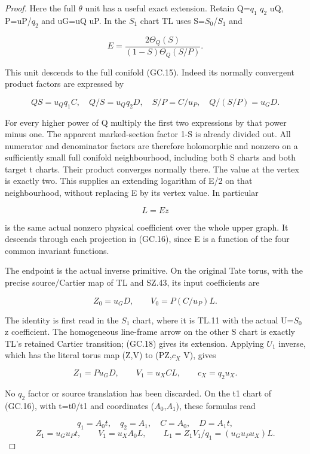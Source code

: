 \begin{proof}
Here the full \(\theta\) unit has a useful exact extension. Retain
Q=\(q_1\) \(q_2\) uQ, P=uP/\(q_2\) and uG=uQ uP. In the \(S_1\) chart TL uses
S=\(S_0\)/\(S_1\) and

\[
 E=\frac{2\Theta_Q(S)}{(1-S)\Theta_Q(S/P)}.
 \tag{GC.17}
\]

This unit descends to the full conifold (GC.15). Indeed its
normally convergent product factors are expressed by

\[
 QS=u_Qq_1C,\quad Q/S=u_Qq_2D,\quad
 S/P=C/u_P,\quad Q/(S/P)=u_GD.
 \tag{GC.18}
\]

For every higher power of Q multiply the first two expressions
by that power minus one. The apparent marked-section factor
1-S is already divided out. All numerator and denominator
factors are therefore holomorphic and nonzero on a sufficiently
small full conifold neighbourhood, including both S charts and
both target t charts. Their product converges normally there.
The value at the vertex is exactly two. This supplies an
extending logarithm of E/2 on that neighbourhood, without
replacing E by its vertex value. In particular

\[
                              L=E z
 \tag{GC.19}
\]

is the same actual nonzero physical coefficient over the whole
upper graph. It descends through each projection in (GC.16),
since E is a function of the four common invariant functions.

The endpoint is the actual inverse primitive. On the original
Tate torus, with the precise source/Cartier map of TL and SZ.43,
its input coefficients are

\[
              Z_0=u_GD,\qquad V_0=P(C/u_P)L.
 \tag{GC.20}
\]

The identity is first read in the \(S_1\) chart, where it is TL.11
with the actual U=\(S_0\) z coefficient. The homogeneous line-frame
arrow on the other S chart is exactly TL's retained Cartier
transition; (GC.18) gives its extension. Applying \(U_1\) inverse,
which has the literal torus map (Z,V) to (PZ,\(c_{X}\) V), gives

\[
 Z_1=Pu_GD,\qquad V_1=u_X C L,
                  \qquad c_X=q_2u_X .
 \tag{GC.21}
\]

No \(q_2\) factor or source translation has been discarded. On the
t1 chart of (GC.16), with t=t0/t1 and coordinates (\(A_0\),\(A_1\)),
these formulas read

\[
 q_1=A_0t,\quad q_2=A_1,\quad C=A_0,\quad D=A_1t,
\]
\[
 Z_1=u_Gu_Pt,\qquad V_1=u_XA_0L,\qquad
 L_1=Z_1V_1/q_1=(u_Gu_Pu_X)L .
 \tag{GC.22}
\]


\end{proof}
